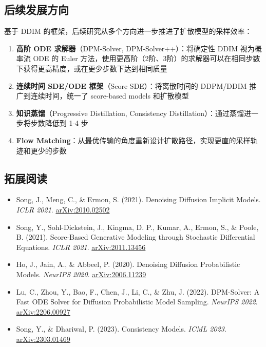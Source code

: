 \documentclass[a4paper]{article}
\begin{document}
\subsection{后续发展方向}

基于 DDIM 的框架，后续研究从多个方向进一步推进了扩散模型的采样效率：

\begin{enumerate}
    \item \textbf{高阶 ODE 求解器}（DPM-Solver, DPM-Solver++）：将确定性 DDIM 视为概率流 ODE 的 Euler 方法，使用更高阶（2阶、3阶）的求解器可以在相同步数下获得更高精度，或在更少步数下达到相同质量
    \item \textbf{连续时间 SDE/ODE 框架}（Score SDE）：将离散时间的 DDPM/DDIM 推广到连续时间，统一了 score-based models 和扩散模型
    \item \textbf{知识蒸馏}（Progressive Distillation, Consistency Distillation）：通过蒸馏进一步将步数降低到 1-4 步
    \item \textbf{Flow Matching}：从最优传输的角度重新设计扩散路径，实现更直的采样轨迹和更少的步数
\end{enumerate}

\subsection{拓展阅读}

\begin{itemize}
    \item Song, J., Meng, C., \& Ermon, S. (2021). Denoising Diffusion Implicit Models. \textit{ICLR 2021}. \href{https://arxiv.org/abs/2010.02502}{arXiv:2010.02502}
    \item Song, Y., Sohl-Dickstein, J., Kingma, D. P., Kumar, A., Ermon, S., \& Poole, B. (2021). Score-Based Generative Modeling through Stochastic Differential Equations. \textit{ICLR 2021}. \href{https://arxiv.org/abs/2011.13456}{arXiv:2011.13456}
    \item Ho, J., Jain, A., \& Abbeel, P. (2020). Denoising Diffusion Probabilistic Models. \textit{NeurIPS 2020}. \href{https://arxiv.org/abs/2006.11239}{arXiv:2006.11239}
    \item Lu, C., Zhou, Y., Bao, F., Chen, J., Li, C., \& Zhu, J. (2022). DPM-Solver: A Fast ODE Solver for Diffusion Probabilistic Model Sampling. \textit{NeurIPS 2022}. \href{https://arxiv.org/abs/2206.00927}{arXiv:2206.00927}
    \item Song, Y., \& Dhariwal, P. (2023). Consistency Models. \textit{ICML 2023}. \href{https://arxiv.org/abs/2303.01469}{arXiv:2303.01469}
\end{itemize}

\end{document}

